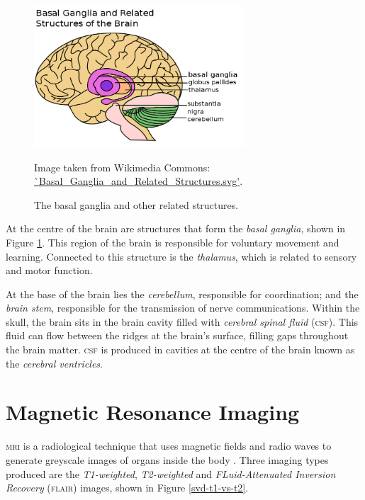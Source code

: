\begin{figure}[ht]
	\centering
	\includegraphics[width=0.7\textwidth]{Images/2_Basal_Ganglia_and_Related_Structures.png}
	\caption{\small{The basal ganglia and other related structures.}}
	\small Image taken from Wikimedia Commons: \url{`Basal_Ganglia_and_Related_Structures.svg'}.
	\label{svd-basalfig}
\end{figure}

At the centre of the brain are structures that form the \textit{basal ganglia}, shown in Figure \ref{svd-basalfig}. This region of the brain is responsible for voluntary movement and learning. Connected to this structure is the \textit{thalamus}, which is related to sensory and motor function.

At the base of the brain lies the \textit{cerebellum}, responsible for coordination; and the \textit{brain stem}, responsible for the transmission of nerve communications. Within the skull, the brain sits in the brain cavity filled with \textit{cerebral spinal fluid} (\textsc{csf}). This fluid can flow between the ridges at the brain's surface, filling gaps throughout the brain matter. \textsc{csf} is produced in cavities at the centre of the brain known as the \textit{cerebral ventricles}.


\section{Magnetic Resonance Imaging}\label{svd-MRI}

\textsc{mri} is a radiological technique that uses magnetic fields and radio waves to generate greyscale images of organs inside the body \citep{Rinck2013}. Three imaging types produced are the \textit{T1-weighted}, \textit{T2-weighted} and \textit{FLuid-Attenuated Inversion Recovery} (\textsc{flair}) images, shown in Figure \ref{svd-t1-vs-t2}.

